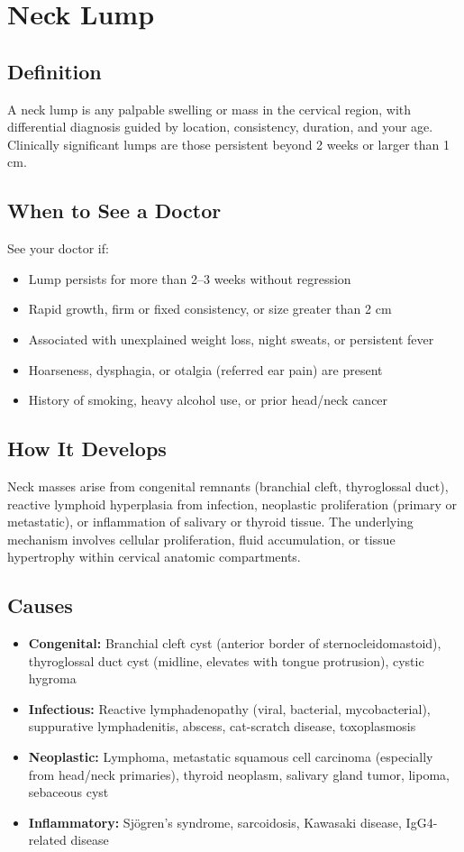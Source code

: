 \chapter{Neck Lump}

\section*{Definition}
A neck lump is any palpable swelling or mass in the cervical region, with differential diagnosis guided by location, consistency, duration, and your age. Clinically significant lumps are those persistent beyond 2 weeks or larger than 1 cm.

\section*{When to See a Doctor}
See your doctor if:
\begin{itemize}
  \item Lump persists for more than 2--3 weeks without regression
  \item Rapid growth, firm or fixed consistency, or size greater than 2 cm
  \item Associated with unexplained weight loss, night sweats, or persistent fever
  \item Hoarseness, dysphagia, or otalgia (referred ear pain) are present
  \item History of smoking, heavy alcohol use, or prior head/neck cancer
\end{itemize}

\section*{How It Develops}
Neck masses arise from congenital remnants (branchial cleft, thyroglossal duct), reactive lymphoid hyperplasia from infection, neoplastic proliferation (primary or metastatic), or inflammation of salivary or thyroid tissue. The underlying mechanism involves cellular proliferation, fluid accumulation, or tissue hypertrophy within cervical anatomic compartments.

\section*{Causes}
\begin{itemize}
  \item \textbf{Congenital:} Branchial cleft cyst (anterior border of sternocleidomastoid), thyroglossal duct cyst (midline, elevates with tongue protrusion), cystic hygroma
  \item \textbf{Infectious:} Reactive lymphadenopathy (viral, bacterial, mycobacterial), suppurative lymphadenitis, abscess, cat-scratch disease, toxoplasmosis
  \item \textbf{Neoplastic:} Lymphoma, metastatic squamous cell carcinoma (especially from head/neck primaries), thyroid neoplasm, salivary gland tumor, lipoma, sebaceous cyst
  \item \textbf{Inflammatory:} Sj\"ogren's syndrome, sarcoidosis, Kawasaki disease, IgG4-related disease
\end{itemize}

